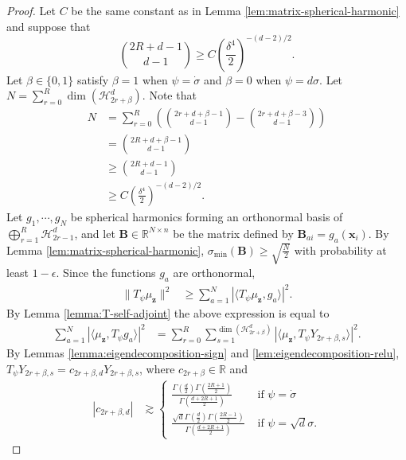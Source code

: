 \documentclass{article}
\theoremstyle{definition}
\newcommand*{\R}{\mathbb{R}}
\newcommand{\mc}{\mathcal}
\def\vx{{\bm{x}}}
\def\vz{{\bm{z}}}
\def\mB{{\bm{B}}}
\begin{document}
\begin{proof}
    Let $C$ be the same constant as in Lemma \ref{lem:matrix-spherical-harmonic} and suppose that
    \[\binom{2R + d - 1}{d - 1} \geq C\left(\frac{\delta^4}{2}\right)^{-(d - 2)/2}. \]
    Let $\beta \in \{0, 1\}$ satisfy $\beta = 1$ when $\psi = \dot{\sigma}$ and $\beta = 0$ when $\psi = d\sigma$.
    Let $N = \sum_{r = 0}^R \dim(\mc{H}_{2r + \beta}^d)$.
    Note that
    \begin{align*}
        N &= \sum_{r = 0}^R\left(\binom{2r + d + \beta - 1}{d - 1} - \binom{2r + d + \beta - 3}{d - 1} \right) \\&= \binom{2R + d + \beta - 1}{d - 1}\\
        &\geq \binom{2R + d - 1}{d - 1}\\
        &\geq C\left(\frac{\delta^4}{2}\right)^{-(d - 2)/2}.
    \end{align*}
    Let $g_1, \cdots, g_N$ be spherical harmonics forming an orthonormal basis of $\bigoplus_{r = 1}^R \mc{H}_{2r - 1}^d$, and let $\mB \in \R^{N \times n}$ be the matrix defined by $\mB_{ai} = g_a(\vx_i)$. By Lemma \ref{lem:matrix-spherical-harmonic}, $\sigma_{\min}(\mB) \geq \sqrt{\frac{N}{2} }$ with probability at least $1 - \epsilon$. Since the functions $g_a$ are orthonormal,
    \begin{align*}
        \|T_{\psi}\mu_{\vz}\|^2 &\geq \sum_{a = 1}^N  |\langle T_{\psi}\mu_{\vz}, g_a \rangle|^2.
    \end{align*}
    By Lemma \ref{lemma:T-self-adjoint} the above expression is equal to
    \begin{align*}
        \sum_{a = 1}^N |\langle \mu_{\vz}, T_{\psi} g_a \rangle|^2 &= \sum_{r = 0}^R\sum_{s = 1}^{\dim\left(\mc{H}_{2r + \beta}^d \right) } \left|\langle \mu_{\vz}, T_{\psi}Y_{2r + \beta, s} \rangle \right|^2.
    \end{align*}
    By Lemmas \ref{lemma:eigendecomposition-sign} and \ref{lem:eigendecomposition-relu}, $T_{\psi} Y_{2r + \beta, s} = c_{2r + \beta,d} Y_{2r + \beta, s}$, where $c_{2r + \beta} \in \R$ and
    \begin{align}\label{eq:coefficient-asymptotics}
        |c_{2r + \beta,d}| &\gtrsim \begin{cases}
           \frac{\Gamma\left(\frac{d}{2}\right)\Gamma\left(\frac{2R + 1}{2}\right) }{\Gamma\left(\frac{d + 2R + 1}{2}\right) } & \text{ if $\psi = \dot{\sigma}$}\\
           \frac{\sqrt{d}\Gamma\left(\frac{d}{2}\right)\Gamma\left(\frac{2R - 1}{2}\right) }{\Gamma\left(\frac{d + 2R + 1}{2}\right) } & \text{ if $\psi = \sqrt{d}\sigma$.}

\end{cases}
\end{align}
\end{proof}
\end{document}
